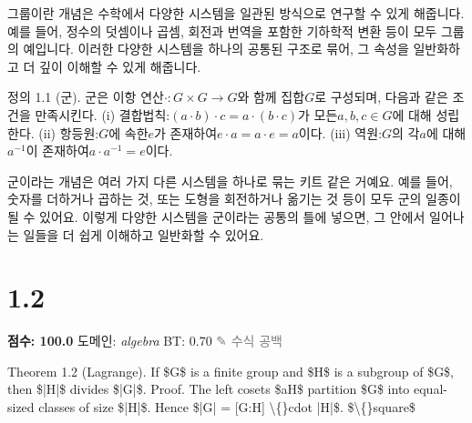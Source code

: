 \documentclass[11pt,a4paper,oneside]{memoir}
\begin{document}
\begin{tcolorbox}[kostyle]
\begin{motivation}
그룹이란 개념은 수학에서 다양한 시스템을 일관된 방식으로 연구할 수 있게 해줍니다. 예를 들어, 정수의 덧셈이나 곱셈, 회전과 번역을 포함한 기하학적 변환 등이 모두 그룹의 예입니다. 이러한 다양한 시스템을 하나의 공통된 구조로 묶어, 그 속성을 일반화하고 더 깊이 이해할 수 있게 해줍니다.
\end{motivation}

정의 1.1 (군). 군은 이항 연산$\cdot: G \times G \to G$와 함께 집합$G$로 구성되며, 다음과 같은 조건을 만족시킨다. (i) 결합법칙:$(a \cdot b) \cdot c = a \cdot (b \cdot c)$가 모든$a, b, c \in G$에 대해 성립한다. (ii) 항등원:$G$에 속한$e$가 존재하여$e \cdot a = a \cdot e = a$이다. (iii) 역원:$G$의 각$a$에 대해$a^{-1}$이 존재하여$a \cdot a^{-1} = e$이다.

\begin{plainexplain}
  군이라는 개념은 여러 가지 다른 시스템을 하나로 묶는 키트 같은 거예요. 예를 들어, 숫자를 더하거나 곱하는 것, 또는 도형을 회전하거나 옮기는 것 등이 모두 군의 일종이 될 수 있어요. 이렇게 다양한 시스템을 군이라는 공통의 틀에 넣으면, 그 안에서 일어나는 일들을 더 쉽게 이해하고 일반화할 수 있어요.
\end{plainexplain}
\end{tcolorbox}
\vspace{0.8em}

\section{1.2}
\noindent \textbf{\color{ScoreGreen}점수: 100.0} \quad 도메인: \textit{algebra}  \quad \textcolor{ScoreGreen}{BT: 0.70} \quad \textcolor{gray}{\small ✎ 수식 공백}
\vspace{0.4em}

\begin{tcolorbox}[origstyle]
\small Theorem 1.2 (Lagrange). If \$G\$ is a finite group and \$H\$ is a subgroup of \$G\$, then \$|H|\$ divides \$|G|\$. Proof. The left cosets \$aH\$ partition \$G\$ into equal-sized classes of size \$|H|\$. Hence \$|G| = [G:H] \textbackslash\{\}cdot |H|\$. \$\textbackslash\{\}square\$
\end{tcolorbox}
\vspace{0.3em}
\end{document}
